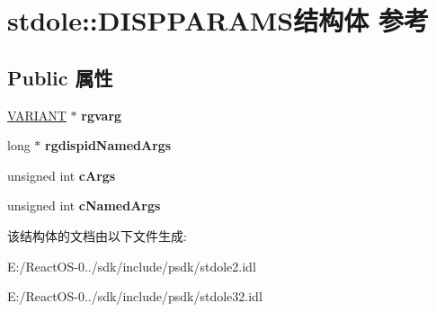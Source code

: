 \hypertarget{structstdole_1_1_d_i_s_p_p_a_r_a_m_s}{}\section{stdole\+:\+:D\+I\+S\+P\+P\+A\+R\+A\+M\+S结构体 参考}
\label{structstdole_1_1_d_i_s_p_p_a_r_a_m_s}
\subsection*{Public 属性}
\begin{DoxyCompactItemize}
\item 
\mbox{\label{structstdole_1_1_d_i_s_p_p_a_r_a_m_s_ab0f34e84625e458280b2fc605bf8ee0f}} 
\hyperlink{interfacevoid}{V\+A\+R\+I\+A\+NT} $\ast$ {\bfseries rgvarg}
\item 
\mbox{\label{structstdole_1_1_d_i_s_p_p_a_r_a_m_s_a649be3aa49f6fa26c4ebcfd282ae62b4}} 
long $\ast$ {\bfseries rgdispid\+Named\+Args}
\item 
\mbox{\label{structstdole_1_1_d_i_s_p_p_a_r_a_m_s_af9b845bb555d32e4c20eedb279874293}} 
unsigned int {\bfseries c\+Args}
\item 
\mbox{\label{structstdole_1_1_d_i_s_p_p_a_r_a_m_s_a09ec0e42596e0e9ae5248fc24f4366ea}} 
unsigned int {\bfseries c\+Named\+Args}
\end{DoxyCompactItemize}


该结构体的文档由以下文件生成\+:\begin{DoxyCompactItemize}
\item 
E\+:/\+React\+O\+S-\/0../sdk/include/psdk/stdole2.\+idl\item 
E\+:/\+React\+O\+S-\/0../sdk/include/psdk/stdole32.\+idl\end{DoxyCompactItemize}
